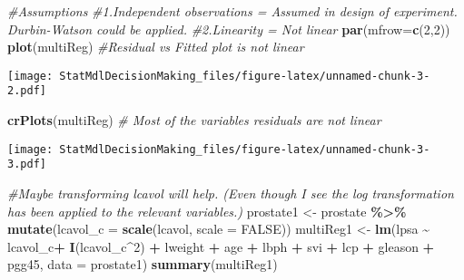 \documentclass[
]{article}
\newenvironment{Shaded}{\begin{snugshade}}{\end{snugshade}}
\newcommand{\AttributeTok}[1]{\textcolor[rgb]{0.13,0.29,0.53}{#1}}
\newcommand{\CommentTok}[1]{\textcolor[rgb]{0.56,0.35,0.01}{\textit{#1}}}
\newcommand{\ConstantTok}[1]{\textcolor[rgb]{0.56,0.35,0.01}{#1}}
\newcommand{\DecValTok}[1]{\textcolor[rgb]{0.00,0.00,0.81}{#1}}
\newcommand{\FunctionTok}[1]{\textcolor[rgb]{0.13,0.29,0.53}{\textbf{#1}}}
\newcommand{\NormalTok}[1]{#1}
\newcommand{\OtherTok}[1]{\textcolor[rgb]{0.56,0.35,0.01}{#1}}
\newcommand{\SpecialCharTok}[1]{\textcolor[rgb]{0.81,0.36,0.00}{\textbf{#1}}}
\begin{document}
\begin{Shaded}
\begin{Highlighting}[]
  \CommentTok{\#Assumptions}
    \CommentTok{\#1.Independent observations = Assumed in design of experiment. Durbin{-}Watson could be applied.}
    \CommentTok{\#2.Linearity = Not linear}
      \FunctionTok{par}\NormalTok{(}\AttributeTok{mfrow=}\FunctionTok{c}\NormalTok{(}\DecValTok{2}\NormalTok{,}\DecValTok{2}\NormalTok{))}
      \FunctionTok{plot}\NormalTok{(multiReg) }\CommentTok{\#Residual vs Fitted plot is not linear}
\end{Highlighting}
\end{Shaded}

\texttt{[image: StatMdlDecisionMaking\_files/figure-latex/unnamed-chunk-3-2.pdf]}

\begin{Shaded}
\begin{Highlighting}[]
      \FunctionTok{crPlots}\NormalTok{(multiReg) }\CommentTok{\# Most of the variables\textquotesingle{} residuals are not linear}
\end{Highlighting}
\end{Shaded}

\texttt{[image: StatMdlDecisionMaking\_files/figure-latex/unnamed-chunk-3-3.pdf]}

\begin{Shaded}
\begin{Highlighting}[]
      \CommentTok{\#Maybe transforming lcavol will help. (Even though I see the log transformation has been applied to the relevant variables.)}
\NormalTok{      prostate1 }\OtherTok{\textless{}{-}}\NormalTok{ prostate }\SpecialCharTok{\%\textgreater{}\%} \FunctionTok{mutate}\NormalTok{(}\AttributeTok{lcavol\_c =} \FunctionTok{scale}\NormalTok{(lcavol, }\AttributeTok{scale =} \ConstantTok{FALSE}\NormalTok{))}
\NormalTok{      multiReg1 }\OtherTok{\textless{}{-}} \FunctionTok{lm}\NormalTok{(lpsa }\SpecialCharTok{\textasciitilde{}}\NormalTok{ lcavol\_c}\SpecialCharTok{+} \FunctionTok{I}\NormalTok{(lcavol\_c}\SpecialCharTok{\^{}}\DecValTok{2}\NormalTok{) }\SpecialCharTok{+}\NormalTok{ lweight }\SpecialCharTok{+}\NormalTok{ age }\SpecialCharTok{+}\NormalTok{ lbph }\SpecialCharTok{+}\NormalTok{ svi }\SpecialCharTok{+}\NormalTok{ lcp }\SpecialCharTok{+}\NormalTok{ gleason }\SpecialCharTok{+}\NormalTok{ pgg45, }\AttributeTok{data =}\NormalTok{ prostate1)}
      \FunctionTok{summary}\NormalTok{(multiReg1)}
\end{Highlighting}
\end{Shaded}
\end{document}
